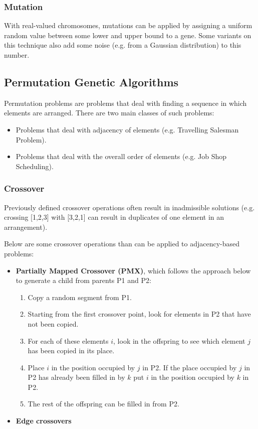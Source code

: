 \documentclass[12pt,titlepage]{article}
\begin{document}
      \subsubsection{Mutation}
        With real-valued chromosomes, mutations can be applied by assigning a uniform random value between some lower and upper bound to a gene. Some variants on this technique also
        add some noise (e.g. from a Gaussian distribution) to this number.

    \subsection{Permutation Genetic Algorithms}
      Permutation problems are problems that deal with finding a sequence in which elements are arranged. There are two main classes of such problems:
      \begin{itemize}
        \item Problems that deal with adjacency of elements (e.g. Travelling Salesman Problem).
        \item Problems that deal with the overall order of elements (e.g. Job Shop Scheduling).
      \end{itemize}

      \subsubsection{Crossover}
        Previously defined crossover operations often result in inadmissible solutions (e.g. crossing [1,2,3] with [3,2,1] can result in duplicates of one element in an arrangement).

        Below are some crossover operations than can be applied to adjacency-based problems:
        \begin{itemize}
          \item \textbf{Partially Mapped Crossover (PMX)}, which follows the approach below to generate a child from parents P1 and P2:
            \begin{enumerate}
              \item Copy a random segment from P1.
              \item Starting from the first crossover point, look for elements in P2 that have not been copied.
              \item For each of these elements $i$, look in the offspring to see which element $j$ has been copied in its place.
              \item Place $i$ in the position occupied by $j$ in P2. If the place occupied by $j$ in P2 has already been filled in by $k$ put $i$ in the position occupied by $k$ in P2.
              \item The rest of the offspring can be filled in from P2.
            \end{enumerate}
          \item \textbf{Edge crossovers}
        \end{itemize}
\end{document}
